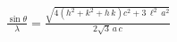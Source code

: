 


\begin{eqnarray*}
  \frac{\sin \theta}{\lambda} = \frac{\sqrt{4 \left( h^2+k^2+h\,k \right) c^2 +
3\,\ell^2\,a^2}}{2\sqrt{3}\,a\,c}
\end{eqnarray*}

